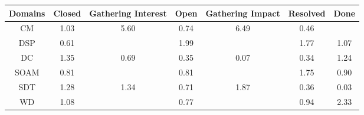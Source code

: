 \begin{tabular}{|c||c|c|c|c|c|c|}
\hline
Domains & Closed & Gathering Interest & Open & Gathering Impact & Resolved & Done \\ 
\hline
CM & \cellcolor[rgb]{0.9082117442458223,0.8391529314848631,0.42} 1.03 & \cellcolor[rgb]{0.5917148458392838,0.6892333480291345,0.42} 5.60 & \cellcolor[rgb]{0.8692642299362436,0.6471840216982192,0.38197994794049395} 0.74 & \cellcolor[rgb]{0.53,0.66,0.42} 6.49 & \cellcolor[rgb]{0.8268316686961229,0.4463365651616482,0.34237622411638136} 0.46 &  \\ 
\hline
DSP & \cellcolor[rgb]{0.8503631783338431,0.5577190441135238,0.3643389664449202} 0.61 &  & \cellcolor[rgb]{0.8414923931674213,0.8075490283424628,0.42} 1.99 &  & \cellcolor[rgb]{0.8563454340986668,0.8145846793098948,0.42} 1.77 & \cellcolor[rgb]{0.9053302677935819,0.8377880215864336,0.42} 1.07 \\ 
\hline
DC & \cellcolor[rgb]{0.8854483098916347,0.8283702520539321,0.42} 1.35 & \cellcolor[rgb]{0.8618834875818422,0.6122485078873867,0.37509125507638613} 0.69 & \cellcolor[rgb]{0.8094939312260123,0.36427127446979135,0.3261943358109448} 0.35 & \cellcolor[rgb]{0.7663428404790444,0.16002277826747704,0.2859199844471082} 0.07 & \cellcolor[rgb]{0.8081597595638152,0.3579561952687251,0.3249491089262275} 0.34 & \cellcolor[rgb]{0.8936628305880405,0.8322613408048612,0.42} 1.24 \\ 
\hline
SOAM & \cellcolor[rgb]{0.8807438352704025,0.7015208202799048,0.3926942462523756} 0.81 &  & \cellcolor[rgb]{0.8810724427755892,0.7030762291377886,0.39300094659054985} 0.81 &  & \cellcolor[rgb]{0.8578461545919494,0.815295546911976,0.42} 1.75 & \cellcolor[rgb]{0.8942359976139664,0.7653837220394406,0.40528693110636854} 0.90 \\ 
\hline
SDT & \cellcolor[rgb]{0.890308850775061,0.8306726135250289,0.42} 1.28 & \cellcolor[rgb]{0.886223155593178,0.8287372842283474,0.42} 1.34 & \cellcolor[rgb]{0.864819690872371,0.6261465367958895,0.37783171148087963} 0.71 & \cellcolor[rgb]{0.8497065991464394,0.8114399680167343,0.42} 1.87 & \cellcolor[rgb]{0.8119780403208391,0.37602939085197173,0.32851283763278316} 0.36 & \cellcolor[rgb]{0.76,0.13,0.28} 0.03 \\ 
\hline
WD & \cellcolor[rgb]{0.9047911206588093,0.837532636101541,0.42} 1.08 &  & \cellcolor[rgb]{0.874347359203669,0.671244166897367,0.3867242019234245} 0.77 &  & \cellcolor[rgb]{0.9001773932000949,0.7935063278137824,0.41083223365342186} 0.94 & \cellcolor[rgb]{0.8178305133249111,0.7963407694696947,0.42} 2.33 \\ 
\hline
\end{tabular}